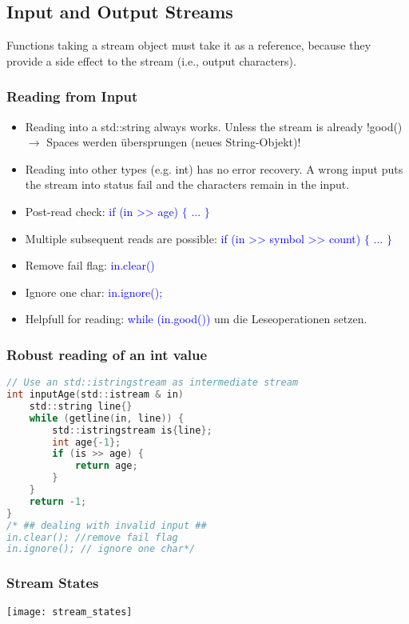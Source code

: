 \subsection{Input and Output Streams}
Functions taking a stream object must take it as a reference, because they provide a side effect to the stream (i.e., output characters).
\subsubsection{Reading from Input}
\begin{itemize}
    \item Reading into a std::string always works. Unless the stream is already !good() $\rightarrow$ Spaces werden übersprungen (neues String-Objekt)!
    \item Reading into other types (e.g. int) has no error recovery. A wrong input puts the stream into status fail and the characters remain in the input.
    \item Post-read check: \textcolor{blue}{if (in >> age) $\{$ ... $\}$}
    \item Multiple subsequent reads are possible: \textcolor{blue}{if (in >> symbol >> count) $\{$ ... $\}$}
    \item Remove fail flag: \textcolor{blue}{in.clear()}
    \item Ignore one char: \textcolor{blue}{in.ignore();}
    \item Helpfull for reading: \textcolor{blue}{while (in.good())} um die Leseoperationen setzen.
\end{itemize}

\subsubsection{Robust reading of an int value}
\begin{lstlisting}[style=frame, style= linenumbers, language=C]
// Use an std::istringstream as intermediate stream
int inputAge(std::istream & in)
    std::string line{}
    while (getline(in, line)) {
        std::istringstream is{line};
        int age{-1};
        if (is >> age) {
            return age;
        }
    }
    return -1;
}
/* ## dealing with invalid input ##
in.clear(); //remove fail flag
in.ignore(); // ignore one char*/

\end{lstlisting}

\subsubsection{Stream States}
\texttt{[image: stream\_states]}